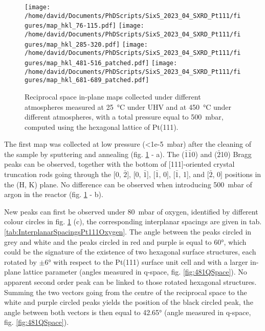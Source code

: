 \begin{figure}[!htb]
    \centering
    \texttt{[image: /home/david/Documents/PhDScripts/SixS\_2023\_04\_SXRD\_Pt111/figures/map\_hkl\_76-115.pdf]}
    \texttt{[image: /home/david/Documents/PhDScripts/SixS\_2023\_04\_SXRD\_Pt111/figures/map\_hkl\_285-320.pdf]}
    \texttt{[image: /home/david/Documents/PhDScripts/SixS\_2023\_04\_SXRD\_Pt111/figures/map\_hkl\_481-516\_patched.pdf]}
    \texttt{[image: /home/david/Documents/PhDScripts/SixS\_2023\_04\_SXRD\_Pt111/figures/map\_hkl\_681-689\_patched.pdf]}
    \caption{
        Reciprocal space in-plane maps collected under different atmospheres measured at \qty{25}{\degreeCelsius} under UHV and at \qty{450}{\degreeCelsius} under different atmospheres, with a total pressure equal to \qty{500}{\milli\bar}, computed using the hexagonal lattice of Pt(111).
    }
    \label{fig:MapsPt111A}
\end{figure}

The first map was collected at low pressure (\qty{<1e-5}{\milli\bar}) after the cleaning of the sample by sputtering and annealing (fig. \ref{fig:MapsPt111A} - a).
The ($\bar{1}$$\bar{1}$0) and ($\bar{2}$10) Bragg peaks can be observed, together with the bottom of [111]-oriented crystal truncation rods going through the [0, $\bar{2}$], [0, $\bar{1}$], [$\bar{1}$, 0], [$\bar{1}$, 1], and [$\bar{2}$, 0] positions in the (H, K) plane.
No difference can be observed when introducing \qty{500}{\milli\bar} of argon in the reactor (fig. \ref{fig:MapsPt111A} - b).

New peaks can first be observed under \qty{80}{\milli\bar} of oxygen, identified by different colour circles in fig. \ref{fig:MapsPt111A} (c), the corresponding interplanar spacings are given in tab. \ref{tab:InterplanarSpacingsPt111Oxygen}.
The angle between the peaks circled in grey and white and the peaks circled in red and purple is equal to \ang{60}, which could be the signature of the existence of two hexagonal surface structures, each rotated by $\pm \ang{6}$ with respect to the Pt(111) surface unit cell and with a larger in-plane lattice parameter (angles measured in q-space, fig. \ref{fig:481QSpace}).
No apparent second order peak can be linked to those rotated hexagonal structures.
Summing the two vectors going from the centre of the reciprocal space to the white and purple circled peaks yields the position of the black circled peak, the angle between both vectors is then equal to \ang{42.65} (angle measured in q-space, fig. \ref{fig:481QSpace}).

